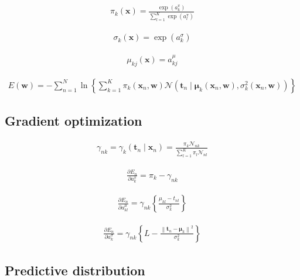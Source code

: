 \documentclass{article}
\begin{document}
\begin{align*}
\pi_{k}(\mathbf{x})=\frac{\exp \left(a_{k}^{\pi}\right)}{\sum_{l=1}^{K} \exp \left(a_{l}^{\pi}\right)} 
\tag{6.40}
\end{align*}

\begin{align*}
\sigma_{k}(\mathbf{x})=\exp \left(a_{k}^{\sigma}\right) 
\tag{6.41}
\end{align*}

\begin{align*}
\mu_{k j}(\mathbf{x})=a_{k j}^{\mu} 
\tag{6.42}
\end{align*}

\begin{align*}
E(\mathbf{w})=-\sum_{n=1}^{N} \ln \left\{\sum_{k=1}^{K} \pi_{k}\left(\mathbf{x}_{n}, \mathbf{w}\right) \mathcal{N}\left(\mathbf{t}_{n} \mid \boldsymbol{\mu}_{k}\left(\mathbf{x}_{n}, \mathbf{w}\right), \sigma_{k}^{2}\left(\mathbf{x}_{n}, \mathbf{w}\right)\right)\right\} 
\tag{6.43}
\end{align*}

\subsection{Gradient optimization}

\begin{align*}
\gamma_{n k}=\gamma_{k}\left(\mathbf{t}_{n} \mid \mathbf{x}_{n}\right)=\frac{\pi_{k} \mathcal{N}_{n k}}{\sum_{l=1}^{K} \pi_{l} \mathcal{N}_{n l}} 
\tag{6.44}
\end{align*}

\begin{align*}
\frac{\partial E_{n}}{\partial a_{k}^{\pi}}=\pi_{k}-\gamma_{n k} 
\tag{6.45}
\end{align*}

\begin{align*}
\frac{\partial E_{n}}{\partial a_{k l}^{\mu}}=\gamma_{n k}\left\{\frac{\mu_{k l}-t_{n l}}{\sigma_{k}^{2}}\right\} 
\tag{6.46}
\end{align*}

\begin{align*}
\frac{\partial E_{n}}{\partial a_{k}^{\sigma}}=\gamma_{n k}\left\{L-\frac{\left\|\mathbf{t}_{n}-\boldsymbol{\mu}_{k}\right\|^{2}}{\sigma_{k}^{2}}\right\} 
\tag{6.47}
\end{align*}

\subsection{Predictive distribution}
\end{document}
